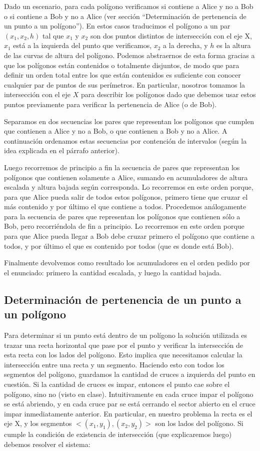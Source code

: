 Dado un escenario, para cada polígono verificamos si contiene a Alice y
no a Bob o si contiene a Bob y no a Alice (ver sección ``Determinación
de pertenencia de un punto a un polígono''). En estos casos traducimos
el polígono a un par $(x_1, x_2, h)$ tal que $x_1$ y $x_2$ son dos puntos
distintos de intersección con el eje X, $x_1$ está a la izquierda del punto
que verificamos, $x_2$ a la derecha, y $h$ es la altura de las curvas de altura
del polígono. Podemos abstraernos de esta forma gracias a que los polígonos
están contenidos o totalmente disjuntos, de modo que para definir un orden
total entre los que están contenidos es suficiente con conocer cualquier par de
puntos de sus perímetros. En particular, nosotros tomamos la intersección
con el eje $X$ para describir los polígonos dado que debemos usar estos
puntos previamente para verificar la pertenencia de Alice (o de Bob).

Separamos en dos secuencias los pares que representan los polígonos que
cumplen que contienen a Alice y no a Bob, o que contienen a Bob y no a Alice. A
continuación ordenamos estas secuencias por contención de intervalos
(según la idea explicada en el párrafo anterior).

Luego recorremos de principio a fin la secuencia de pares que representan los
polígonos que contienen solamente a Alice, sumando en acumuladores de altura
escalada y altura bajada según corresponda. Lo recorremos en este orden
porque, para que Alice pueda salir de todos estos polígonos, primero tiene que
cruzar el más contenido y por último el que contiene a todos. Procedemos
análogamente para la secuencia de pares que representan los polígonos que
contienen sólo a Bob, pero recorriéndola de fin a principio. Lo recorremos
en este orden porque para que Alice pueda llegar a Bob debe cruzar primero el
polígono que contiene a todos, y por último el que es contenido por todos
(que es donde está Bob).

Finalmente devolvemos como resultado los acumuladores en el orden pedido
por el enunciado: primero la cantidad escalada, y luego la cantidad bajada.

\subsection*{Determinación de pertenencia de un punto a un polígono}

Para determinar si un punto está dentro de un polígono la solución utilizada es trazar una recta horizontal
que pase por el punto y verificar la intersección de esta recta con los lados del polígono. Esto implica
que necesitamos calcular la intersección entre una recta y un segmento.
Haciendo esto con todos los segmentos del polígono, guardamos la cantidad de cruces a izquierda del punto
en cuestión. Si la cantidad de cruces es impar, entonces el punto cae sobre el polígono, sino no (visto en
clase). Intuitivamente en cada cruce impar el polígono se está abriendo, y en cada cruce par se está
cerrando el sector abierto en el cruce impar inmediatamente anterior.
En particular, en nuestro problema la recta es el eje X, y los segmentos $<(x_1, y_1), (x_2, y_2)>$ son
los lados del polígono. Si cumple la condición de existencia de intersección (que explicaremos luego)
debemos resolver el sistema:

